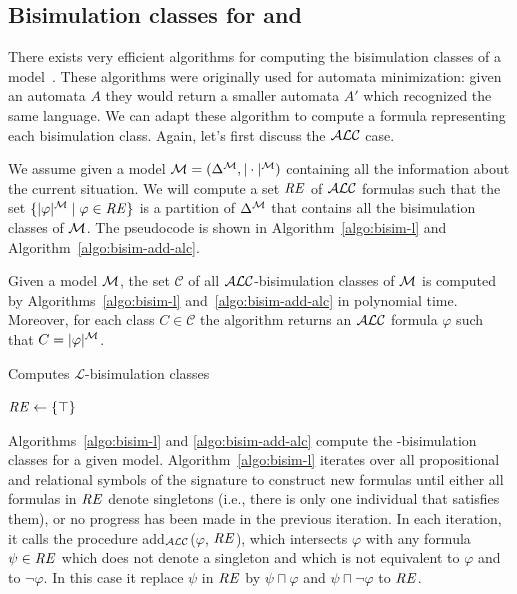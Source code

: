 \subsection{Bisimulation classes for \alc and \el}


There exists very efficient algorithms
for computing the bisimulation classes of a model~\cite{hopc:algo71,paig:thre87,dovier04:_effic_algor_for_comput_bisim_equiv}.
These algorithms were originally used for automata minimization: given an
automata $A$ they would return a smaller automata $A'$ which recognized the
same language.  We can adapt these algorithm to compute a formula representing each bisimulation class.  Again, let's first
discuss the $\mathcal{ALC}$ case.

We assume given a model $\mathcal{M}=(\Delta^{\mathcal{M}}, |\cdot|^{\mathcal{M}})$ containing all the information about the current
situation.  We will compute a set $\mathit{RE}$ of $\mathcal{ALC}$ formulas such that the
set $\{|\varphi|^{\mathcal{M}} \mid \varphi \in \mathit{RE}\}$ is a partition of $\Delta^{\mathcal{M}}$
that contains all the bisimulation classes of $\mathcal{M}$.  The pseudocode is
shown in Algorithm~\ref{algo:bisim-l} and Algorithm~\ref{algo:bisim-add-alc}.


\begin{theorem}\label{theo:bisimulation-classes}
Given a model $\mathcal{M}$, the set $\mathcal{C}$ of all $\mathcal{ALC}$-bisimulation classes
of $\mathcal{M}$ is computed by Algorithms~\ref{algo:bisim-l} and~\ref{algo:bisim-add-alc} in polynomial time.  Moreover, for each class $C \in \mathcal{C}$ the algorithm returns an $\mathcal{ALC}$ formula $\varphi$ such that
$C = |\varphi|^{\mathcal{M}}$.
\end{theorem}

\begin{algorithm}[t]
\dontprintsemicolon
\caption{Computes $\mathcal{L}$-bisimulation classes}
\label{algo:bisim-l}

$\mathit{RE} \leftarrow \{\top\}$


\end{algorithm}

Algorithms~\ref{algo:bisim-l} and \ref{algo:bisim-add-alc} compute
the \alc-bi\-sim\-u\-la\-tion classes for a given model.
Algorithm~\ref{algo:bisim-l} iterates over all propositional and
relational symbols of the signature to construct new formulas until
either all formulas in $\mathit{RE}$ denote singletons (i.e., there is only one
individual that satisfies them), or no progress has been made in the
previous iteration.  In each iteration, it calls the procedure
add$_\mathcal{ALC}$($\varphi$, $\mathit{RE}$), which intersects $\varphi$ with any formula $\psi
\in \mathit{RE}$ which does not denote a singleton and which is
not equivalent to $\varphi$ and to $\neg \varphi$. In this case it
replace $\psi$ in $\mathit{RE}$ by $\psi \sqcap \varphi$ and $\psi \sqcap \neg \varphi$ to
$\mathit{RE}$.

